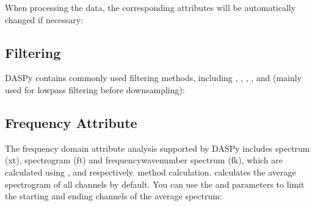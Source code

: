\documentclass[letterpaper,10pt,english]{sphinxmanual}
\begin{document}
\begin{sphinxVerbatim}[commandchars=\\\{\}]
   
  
\end{sphinxVerbatim}

\sphinxAtStartPar
When processing the data, the corresponding attributes will be automatically changed if necessary:

\begin{sphinxVerbatim}[commandchars=\\\{\}]
\end{sphinxVerbatim}


\subsection{Filtering}
\label{\detokenize{Basic Processing:filtering}}\label{\detokenize{Basic Processing:id2}}
\sphinxAtStartPar
DASPy contains commonly used filtering methods, including  ,  ,  ,  ,  and  (mainly used for low\sphinxhyphen{}pass filtering before downsampling):

\begin{sphinxVerbatim}[commandchars=\\\{\}]
 
\end{sphinxVerbatim}


\subsection{Frequency Attribute}
\label{\detokenize{Basic Processing:frequency-attribute}}\label{\detokenize{Basic Processing:id3}}
\sphinxAtStartPar
The frequency domain attribute analysis supported by DASPy includes spectrum (x\sphinxhyphen{}t), spectrogram (f\sphinxhyphen{}t) and frequency\sphinxhyphen{}wavenumber spectrum (f\sphinxhyphen{}k), which are calculated using ,  and  respectively. method calculation.  calculates the average spectrogram of all channels by default. You can use the  and  parameters to limit the starting and ending channels of the average spectrum:
\end{document}
